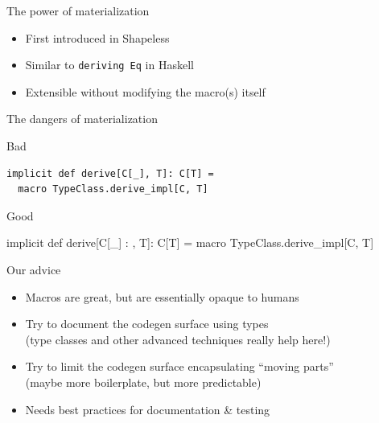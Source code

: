 \documentclass{beamer}
\begin{document}
\begin{frame}{The power of materialization}
  \begin{itemize}
    \item First introduced in Shapeless
    \item Similar to \texttt{deriving Eq} in Haskell
    \item Extensible without modifying the macro(s) itself
  \end{itemize}
\end{frame}

\begin{frame}[fragile]{The dangers of materialization}
  \vspace{1em}
  \begin{alertblock}{Bad}
    \begin{verbatim}
implicit def derive[C[_], T]: C[T] =
  macro TypeClass.derive_impl[C, T]
    \end{verbatim}
  \end{alertblock}

  \vspace{1em}
  \begin{exampleblock}{Good}
    \begin{semiverbatim}
implicit def derive[C[_] : \text{\color{blue}{TypeClass}}, T]: C[T] =
  macro TypeClass.derive_impl[C, T]
    \end{semiverbatim}
  \end{exampleblock}
\end{frame}

\begin{frame}[fragile]{Our advice}
  \begin{itemize}
    \item Macros are great, but are essentially opaque to humans
    \item Try to document the codegen surface using types\\
      (type classes and other advanced techniques really help here!)
    \item Try to limit the codegen surface encapsulating ``moving parts''\\
      (maybe more boilerplate, but more predictable)
    \item Needs best practices for documentation \& testing
  \end{itemize}
\end{frame}

\end{document}
